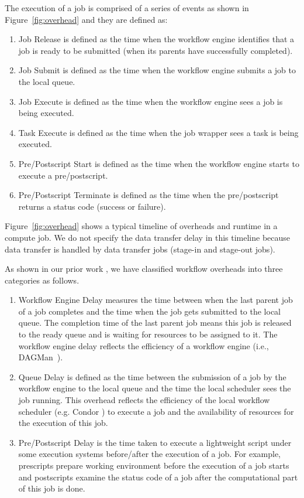 \documentclass[final]{IEEEtran}
\begin{document}
The execution of a job is comprised of a series of events as shown in Figure~\ref{fig:overhead} and they are defined as:
\begin{enumerate}
\item Job Release is defined as the time when the workflow engine identifies that a job is ready to be submitted (when its parents have successfully completed). 
\item Job Submit is defined as the time when the workflow engine submits a job to the local queue. 
\item Job Execute is defined as the time when the workflow engine sees a job is being executed. 
\item Task Execute is defined as the time when the job wrapper sees a task is being executed. 
\item Pre/Postscript Start is defined as the time when the workflow engine starts to execute a pre/postscript. 
\item Pre/Postscript Terminate is defined as the time when the pre/postscript returns a status code (success or failure). 
\end{enumerate}

Figure~\ref{fig:overhead} shows a typical timeline of overheads and runtime in a compute job. We do not specify the data transfer delay in this timeline because data transfer is handled by data transfer jobs (stage-in and stage-out jobs). 

As shown in our prior work \cite{Chen}, we have classified workflow overheads into three categories as follows. 
\begin{enumerate}

\item{Workflow Engine Delay} measures the time between when the last parent job of a job completes and the time when the job gets submitted to the local queue. The completion time of the last parent job means this job is released to the ready queue and is waiting for resources to be assigned to it. The workflow engine delay reflects the efficiency of a workflow engine (i.e., DAGMan~\cite{DAGMan}). 

\item{Queue Delay} is defined as the time between the submission of a job by the workflow engine to the local queue and the time the local scheduler sees the job running. This overhead reflects the efficiency of the local workflow scheduler (e.g. Condor \cite{Frey2002}) to execute a job and the availability of resources for the execution of this job. 

\item{Pre/Postscript Delay } is the time taken to execute a lightweight script under some execution systems before/after the execution of a job. For example, prescripts prepare working environment before the execution of a job starts and postscripts examine the status code of a job after the computational part of this job is done.


\end{enumerate}
\end{document}

